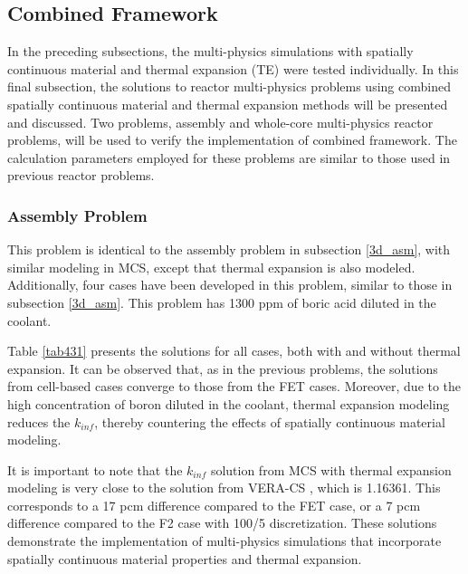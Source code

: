\subsection{Combined Framework} \label{sec43}

In the preceding subsections, the multi-physics simulations with spatially continuous material and thermal expansion (TE) were tested individually. In this final subsection, the solutions to reactor multi-physics problems using combined spatially continuous material and thermal expansion methods will be presented and discussed. Two problems, assembly and whole-core multi-physics reactor problems, will be used to verify the implementation of combined framework. The calculation parameters employed for these problems are similar to those used in previous reactor problems.

\subsubsection{Assembly Problem}

This problem is identical to the assembly problem in subsection \ref{3d_asm}, with similar modeling in MCS, except that thermal expansion is also modeled. Additionally, four cases have been developed in this problem, similar to those in subsection \ref{3d_asm}. This problem has 1300 ppm of boric acid diluted in the coolant.

Table \ref{tab431} presents the solutions for all cases, both with and without thermal expansion. It can be observed that, as in the previous problems, the solutions from cell-based cases converge to those from the FET cases. Moreover, due to the high concentration of boron diluted in the coolant, thermal expansion modeling reduces the $k_{inf}$, thereby countering the effects of spatially continuous material modeling.

It is important to note that the $k_{inf}$ solution from MCS with thermal expansion modeling is very close to the solution from VERA-CS \cite{sieger}, which is 1.16361. This corresponds to a 17 pcm difference compared to the FET case, or a 7 pcm difference compared to the F2 case with 100/5 discretization. These solutions demonstrate the implementation of multi-physics simulations that incorporate spatially continuous material properties and thermal expansion.

